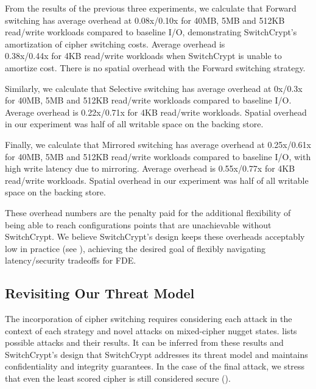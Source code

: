 From the results of the previous three experiments, we calculate that Forward
switching has average overhead at 0.08x/0.10x for 40MB, 5MB and 512KB read/write
workloads compared to baseline I/O, demonstrating SwitchCrypt's amortization of
cipher switching costs. Average overhead is\\0.38x/0.44x for 4KB read/write
workloads when SwitchCrypt is unable to amortize cost. There is no spatial
overhead with the Forward switching strategy.

Similarly, we calculate that Selective switching has average overhead at 0x/0.3x
for 40MB, 5MB and 512KB read/write workloads compared to baseline I/O. Average
overhead is 0.22x/0.71x for 4KB read/write workloads. Spatial overhead in our
experiment was half of all writable space on the backing store.

Finally, we calculate that Mirrored switching has average overhead at
0.25x/0.61x for 40MB, 5MB and 512KB read/write workloads compared to baseline
I/O, with high write latency due to mirroring. Average overhead is 0.55x/0.77x
for 4KB read/write workloads. Spatial overhead in our experiment was half of all
writable space on the backing store.

These overhead numbers are the penalty paid for the additional flexibility of
being able to reach configurations points that are unachievable without
SwitchCrypt. We believe SwitchCrypt's design keeps these overheads acceptably
low in practice (see ), achieving the desired goal of flexibly
navigating latency/security tradeoffs for FDE.

\subsection{Revisiting Our Threat Model}\label{subsec:4}

The incorporation of cipher switching requires considering each attack in the
context of each strategy and novel attacks on mixed-cipher nugget states.
 lists possible attacks and their results. It can be inferred
from these results and SwitchCrypt's design that SwitchCrypt addresses its
threat model and maintains confidentiality and integrity guarantees. In the case
of the final attack, we stress that even the least scored cipher is still
considered secure ().

